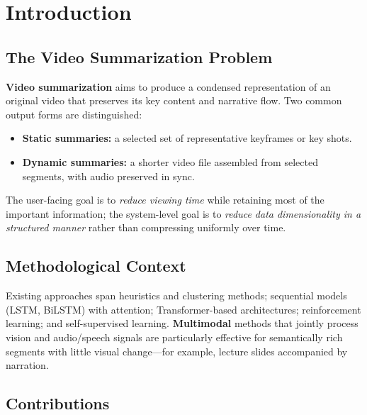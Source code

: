 \documentclass[10pt,conference]{IEEEtran}
\begin{document}
\section{Introduction}

\subsection{The Video Summarization Problem}

\textbf{Video summarization} aims to produce a condensed representation of an
original video that preserves its key content and narrative flow. Two common
output forms are distinguished:
\begin{itemize}
  \item \textbf{Static summaries:} a selected set of representative keyframes
        or key shots.
  \item \textbf{Dynamic summaries:} a shorter video file assembled from
        selected segments, with audio preserved in sync.
\end{itemize}

The user-facing goal is to \emph{reduce viewing time} while retaining most of
the important information; the system-level goal is to \emph{reduce data
dimensionality in a structured manner} rather than compressing uniformly over
time.

\subsection{Methodological Context}

Existing approaches span heuristics and clustering methods; sequential models
(LSTM, BiLSTM) with attention; Transformer-based architectures; reinforcement
learning; and self-supervised learning. \textbf{Multimodal} methods that
jointly process vision and audio/speech signals are particularly effective for
semantically rich segments with little visual change---for example, lecture
slides accompanied by narration.

\subsection{Contributions}
\end{document}

